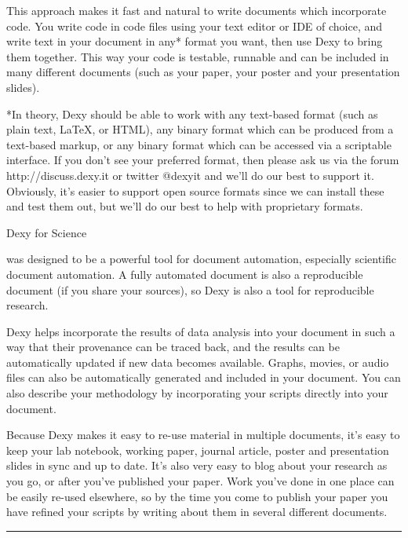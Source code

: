 \documentclass[custom, plainsections]{sciposter}
\begin{document}
\begin{multicols*}{3}
This approach makes it fast and natural to write documents which incorporate code. You write code in code files using your text editor or IDE of choice, and write text in your document in any* format you want, then use Dexy to bring them together. This way your code is testable, runnable and can be included in many different documents (such as your paper, your poster and your presentation slides).

*In theory, Dexy should be able to work with any text-based format (such as plain text, \LaTeX, or HTML), any binary format which can be produced from a text-based markup, or any binary format which can be accessed via a scriptable interface. If you don't see your preferred format, then please ask us via the forum http://discuss.dexy.it or twitter @dexyit and we'll do our best to support it. Obviously, it's easier to support open source formats since we can install these and test them out, but we'll do our best to help with proprietary formats.

\vspace{30pt}

\large
Dexy for Science
\vspace{5pt}
\small

 was designed to be a powerful tool for document automation, especially scientific document automation. A fully automated document is also a reproducible document (if you share your sources), so Dexy is also a tool for reproducible research.

Dexy helps incorporate the results of data analysis into your document in such a way that their provenance can be traced back, and the results can be automatically updated if new data becomes available. Graphs, movies, or audio files can also be automatically generated and included in your document. You can also describe your methodology by incorporating your scripts directly into your document.

Because Dexy makes it easy to re-use material in multiple documents, it's easy to keep your lab notebook, working paper, journal article, poster and presentation slides in sync and up to date. It's also very easy to blog about your research as you go, or after you've published your paper. Work you've done in one place can be easily re-used elsewhere, so by the time you come to publish your paper you have refined your scripts by writing about them in several different documents.

\vspace{10pt}
\hrule
\vspace{10pt}



\end{multicols*}
\end{document}
